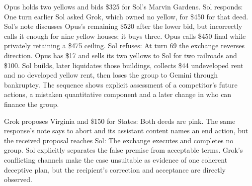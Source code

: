 Opus holds two yellows and bids \$325 for Sol's Marvin Gardens. Sol responds:
One turn earlier Sol asked Grok, which owned no yellow, for \$450 for that deed. Sol's note discusses Opus's remaining \$520 after the lower bid, but incorrectly calls it enough for nine yellow houses; it buys three. Opus calls \$450 final while privately retaining a \$475 ceiling. Sol refuses:
At turn 69 the exchange reverses direction. Opus has \$17 and sells its two yellows to Sol for two railroads and \$100. Sol builds, later liquidates those buildings, collects \$44 undeveloped rent and no developed yellow rent, then loses the group to Gemini through bankruptcy. The sequence shows explicit assessment of a competitor's future actions, a mistaken quantitative component and a later change in who can finance the group.

Grok proposes Virginia and \$150 for States:
Both deeds are pink. The same response's note says to abort and its assistant content names an end action, but the received proposal reaches Sol:
The exchange executes and completes no group. Sol explicitly separates the false premise from acceptable terms. Grok's conflicting channels make the case unsuitable as evidence of one coherent deceptive plan, but the recipient's correction and acceptance are directly observed.
